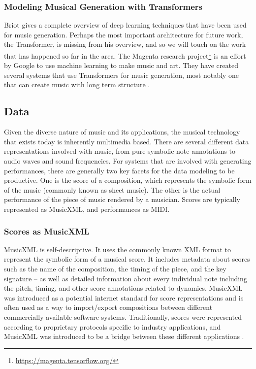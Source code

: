 \documentclass[letterpaper,12pt]{article}
\begin{document}
\subsubsection{Modeling Musical Generation with Transformers}
Briot \cite{briot2017deep} gives a complete overview of deep learning techniques that have been used for music generation. Perhaps the most important architecture for future work, the Transformer, is missing from his overview, and so we will touch on the work that has happened so far in the area. The Magenta research project\footnote{\url{https://magenta.tensorflow.org/}} is an effort by Google to use machine learning to make music and art. They have created several systems that use Transformers for music generation, most notably one that can create music with long term structure \cite{huang2018music}. 

\subsection{Data}
Given the diverse nature of music and its applications, the musical technology that exists today is inherently multimedia based. There are several different data representations involved with music, from pure symbolic note annotations to audio waves and sound frequencies. For systems that are involved with generating performances, there are generally two key facets for the data modeling to be productive. One is the score of a composition, which represents the symbolic form of the music (commonly known as sheet music). The other is the actual performance of the piece of music rendered by a musician. Scores are typically represented as MusicXML, and performances as MIDI. 

\subsubsection{Scores as MusicXML}
MusicXML is self-descriptive. It uses the commonly known XML format to represent the symbolic form of a musical score. It includes metadata about scores such as the name of the composition, the timing of the piece, and the key signature – as well as detailed information about every individual note including the pitch, timing, and other score annotations related to dynamics. MusicXML was introduced as a potential internet standard for score representations and is often used as a way to import/export compositions between different commercially available software systems. Traditionally, scores were represented according to proprietary protocols specific to industry applications, and MusicXML was introduced to be a bridge between these different applications \cite{good2001musicxml}. 
\end{document}
